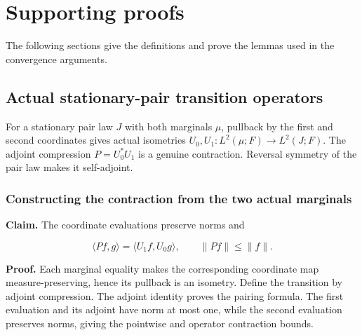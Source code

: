 \documentclass[11pt,a4paper]{report}
\begin{document}
\chapter{Supporting proofs}
The following sections give the definitions and prove the lemmas used in the convergence arguments.

\section{\texorpdfstring{Actual stationary-pair transition operators}{Actual stationary-pair transition operators}}
\label{proof-module-WassersteinMixing-Semigroup-lean}


For a stationary pair law \(J\) with both marginals \(\mu\), pullback by the first and second coordinates gives actual isometries \(U_0,U_1:L^2(\mu;F)\to L^2(J;F)\). The adjoint compression \(P=U_0^*U_1\) is a genuine contraction. Reversal symmetry of the pair law makes it self-adjoint.

\subsection{\texorpdfstring{Constructing the contraction from the two actual marginals}{Constructing the contraction from the two actual marginals}}
\label{report-step-WassersteinMixing-Semigroup-lean-1}


\textbf{Claim.} The coordinate evaluations preserve norms and

\[\langle Pf,g\rangle=\langle U_1f,U_0g\rangle,\qquad\|Pf\|\le\|f\|.\]

\textbf{Proof.} Each marginal equality makes the corresponding coordinate map measure-preserving, hence its pullback is an isometry. Define the transition by adjoint compression. The adjoint identity proves the pairing formula. The first evaluation and its adjoint have norm at most one, while the second evaluation preserves norms, giving the pointwise and operator contraction bounds.
\end{document}
